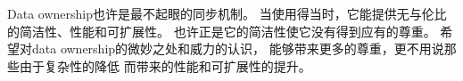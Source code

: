 Data ownership也许是最不起眼的同步机制。
当使用得当时，它能提供无与伦比的简洁性、性能和可扩展性。
也许正是它的简洁性使它没有得到应有的尊重。
希望对data ownership的微妙之处和威力的认识，
能够带来更多的尊重，更不用说那些由于复杂性的降低
而带来的性能和可扩展性的提升。


